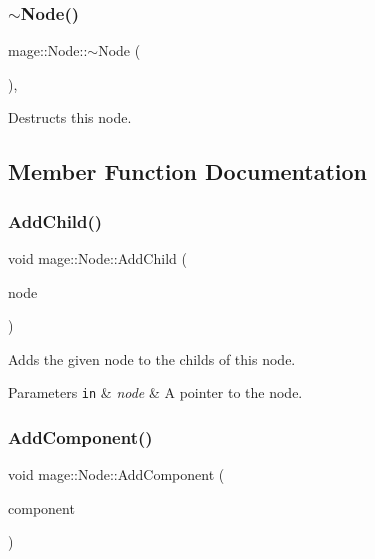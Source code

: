 \subsubsection{\texorpdfstring{$\sim$\+Node()}{~Node()}}
{\footnotesize\ttfamily mage\+::\+Node\+::$\sim$\+Node (\begin{DoxyParamCaption}{ }\end{DoxyParamCaption})\hspace{0.3cm}{\ttfamily [virtual]}, {\ttfamily [default]}}

Destructs this node. 

\subsection{Member Function Documentation}
\hypertarget{classmage_1_1_node_ad2324a1a111548e4b80b8e4cbaba5221}{}\label{classmage_1_1_node_ad2324a1a111548e4b80b8e4cbaba5221} 
\subsubsection{\texorpdfstring{Add\+Child()}{AddChild()}}
{\footnotesize\ttfamily void mage\+::\+Node\+::\+Add\+Child (\begin{DoxyParamCaption}\item[{\hyperlink{classmage_1_1_node_ac575dc006e0ae1134277ade977dc06b6}{Node\+Ptr}}]{node }\end{DoxyParamCaption})}

Adds the given node to the childs of this node.


\begin{DoxyParams}[1]{Parameters}
\mbox{\tt in}  & {\em node} & A pointer to the node. \\
\hline
\end{DoxyParams}
\hypertarget{classmage_1_1_node_a53172eaa92e0fa127bfe362349c96734}{}\label{classmage_1_1_node_a53172eaa92e0fa127bfe362349c96734} 
\subsubsection{\texorpdfstring{Add\+Component()}{AddComponent()}}
{\footnotesize\ttfamily void mage\+::\+Node\+::\+Add\+Component (\begin{DoxyParamCaption}\item[{\hyperlink{classmage_1_1_node_a46b7e1f4f5b98bfa78ed96a80797a4ba}{Component\+Ptr}}]{component }\end{DoxyParamCaption})}

